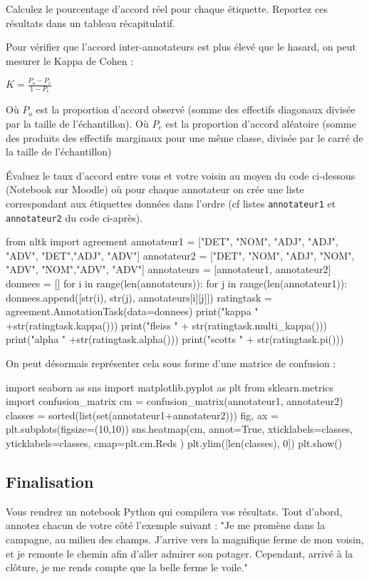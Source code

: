 Calculez le pourcentage d'accord réel pour chaque étiquette. Reportez ces résultats dans un tableau récapitulatif.

 Pour vérifier que l'accord inter-annotateurs est plus élevé que le hasard, on peut mesurer le Kappa de Cohen :

$K = \frac{P_o - P_e}{1-P_e}$

Où $P_o$ est la proportion d'accord observé (somme des effectifs diagonaux divisée par la taille de l'échantillon).
Où $P_e$ est la proportion d'accord aléatoire (somme des produits des effectifs marginaux pour une même classe, divisée par le carré de la taille de l'échantillon)

Évaluez le taux d'accord entre vous et votre voisin au moyen du code ci-dessous (Notebook sur Moodle) où pour chaque annotateur on crée une liste correspondant aux étiquettes données dans l'ordre (cf listes \texttt{annotateur1} et \texttt{annotateur2} du code ci-après).
\newpage
\begin{python}
from nltk import agreement
annotateur1 = ["DET", "NOM", "ADJ", "ADJ", "ADV", "DET","ADJ", "ADV"]
annotateur2 = ["DET", "NOM", "ADJ", "NOM", "ADV", "NOM","ADV", "ADV"]
annotateurs = [annotateur1, annotateur2]
donnees = []
for i in range(len(annotateurs)):
  for j in range(len(annotateur1)):
    donnees.append([str(i), str(j), annotateurs[i][j]])
ratingtask = agreement.AnnotationTask(data=donnees)
print("kappa " +str(ratingtask.kappa()))
print("fleiss " + str(ratingtask.multi_kappa()))
print("alpha " +str(ratingtask.alpha()))
print("scotts " + str(ratingtask.pi()))
\end{python}

On peut désormais représenter cela sous forme d'une matrice de confusion :

\begin{python}
import seaborn as sns
import matplotlib.pyplot as plt
from sklearn.metrics import confusion_matrix
cm = confusion_matrix(annotateur1, annotateur2)
classes = sorted(list(set(annotateur1+annotateur2)))
fig, ax = plt.subplots(figsize=(10,10))
sns.heatmap(cm, 
	annot=True, 
	xticklabels=classes, 
	yticklabels=classes,
	cmap=plt.cm.Reds )
plt.ylim([len(classes), 0])
plt.show()
\end{python}
  \subsection{Finalisation}%
Vous rendrez un notebook Python qui compilera vos résultats. Tout d'abord, annotez chacun de votre côté l'exemple suivant :
 "Je me promène dans la campagne, au milieu des champs. J'arrive vers la magnifique ferme de mon voisin, et je remonte le chemin afin d'aller admirer son potager. Cependant, arrivé à la clôture, je me rends compte que la belle ferme le voile."

